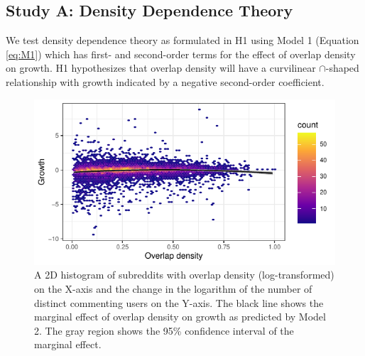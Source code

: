 \documentclass[letterpaper]{article}\usepackage[]{graphicx}\usepackage[]{color}
\begin{document}
\subsection{Study A: Density Dependence Theory}
\label{sec:res:studyA}

We test density dependence theory as formulated in H1 using Model 1  (Equation \ref{eq:M1}) 
which has first- and second-order terms for the effect of overlap density on growth.  H1 hypothesizes that overlap density will have a curvilinear $\cap$-shaped relationship with growth indicated by a negative second-order coefficient.  


\begin{figure}
  \centering

\includegraphics[width=\columnwidth]{figures/knitr-fig_densityxgrowth-1} 

\caption{A 2D histogram of subreddits with overlap density (log-transformed) on the X-axis and the change in the logarithm of the number of distinct commenting users on the Y-axis.  The black line shows the marginal effect of overlap density on growth as predicted by Model 2. The gray region shows the 95\% confidence interval of the marginal effect. \label{fig:density}}
\end{figure}


\end{document}
